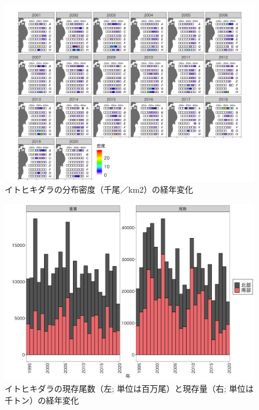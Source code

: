 \documentclass[11pt]{article} %
\begin{document}
\begin{linenumbers}
\begin{figure}[h]
  \centering
  \includegraphics[width = 14cm]{イトヒキダラdens.png}
  \caption{イトヒキダラの分布密度（千尾／km2）の経年変化}
\end{figure}

\begin{figure}[h]
  \centering
  \includegraphics[width = 14cm]{イトヒキダラtrend.png}
  \caption{イトヒキダラの現存尾数（左; 単位は百万尾）と現存量（右; 単位は千トン）の経年変化}
\end{figure}


\end{linenumbers}
\end{document}
